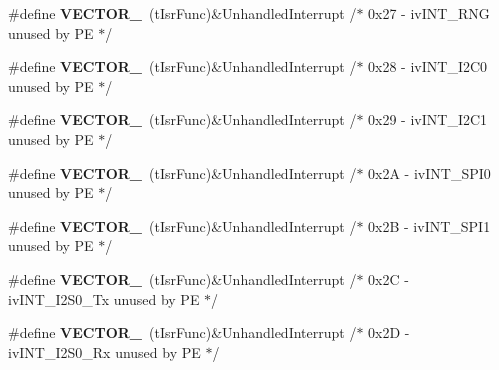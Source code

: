 \begin{DoxyCompactItemize}
\item 
\#define {\bfseries V\+E\+C\+T\+O\+R\+\_}~(t\+Isr\+Func)\&Unhandled\+Interrupt         /$\ast$ 0x27 -\/    iv\+I\+N\+T\+\_\+\+R\+N\+G                      unused by P\+E $\ast$/\hypertarget{group___vectors___config__module_ga8e78b6f08f5736c7d27830555a5fc5af}{}\label{group___vectors___config__module_ga8e78b6f08f5736c7d27830555a5fc5af}

\item 
\#define {\bfseries V\+E\+C\+T\+O\+R\+\_}~(t\+Isr\+Func)\&Unhandled\+Interrupt         /$\ast$ 0x28 -\/    iv\+I\+N\+T\+\_\+\+I2\+C0                     unused by P\+E $\ast$/\hypertarget{group___vectors___config__module_gad5a354561b73a75ae5798b0e790ca397}{}\label{group___vectors___config__module_gad5a354561b73a75ae5798b0e790ca397}

\item 
\#define {\bfseries V\+E\+C\+T\+O\+R\+\_}~(t\+Isr\+Func)\&Unhandled\+Interrupt         /$\ast$ 0x29 -\/    iv\+I\+N\+T\+\_\+\+I2\+C1                     unused by P\+E $\ast$/\hypertarget{group___vectors___config__module_gaac6fd477302bdfa30e4e053c69c0b920}{}\label{group___vectors___config__module_gaac6fd477302bdfa30e4e053c69c0b920}

\item 
\#define {\bfseries V\+E\+C\+T\+O\+R\+\_}~(t\+Isr\+Func)\&Unhandled\+Interrupt         /$\ast$ 0x2\+A -\/    iv\+I\+N\+T\+\_\+\+S\+P\+I0                     unused by P\+E $\ast$/\hypertarget{group___vectors___config__module_ga9363b373824d22c83bd9974ebeca988a}{}\label{group___vectors___config__module_ga9363b373824d22c83bd9974ebeca988a}

\item 
\#define {\bfseries V\+E\+C\+T\+O\+R\+\_}~(t\+Isr\+Func)\&Unhandled\+Interrupt         /$\ast$ 0x2\+B -\/    iv\+I\+N\+T\+\_\+\+S\+P\+I1                     unused by P\+E $\ast$/\hypertarget{group___vectors___config__module_ga1b47c5a4269f149a70a1e8811cef0453}{}\label{group___vectors___config__module_ga1b47c5a4269f149a70a1e8811cef0453}

\item 
\#define {\bfseries V\+E\+C\+T\+O\+R\+\_}~(t\+Isr\+Func)\&Unhandled\+Interrupt         /$\ast$ 0x2\+C -\/    iv\+I\+N\+T\+\_\+\+I2\+S0\+\_\+\+Tx                  unused by P\+E $\ast$/\hypertarget{group___vectors___config__module_gaa8ed1215ef9bb47f5115245fedc392fd}{}\label{group___vectors___config__module_gaa8ed1215ef9bb47f5115245fedc392fd}

\item 
\#define {\bfseries V\+E\+C\+T\+O\+R\+\_}~(t\+Isr\+Func)\&Unhandled\+Interrupt         /$\ast$ 0x2\+D -\/    iv\+I\+N\+T\+\_\+\+I2\+S0\+\_\+\+Rx                  unused by P\+E $\ast$/\hypertarget{group___vectors___config__module_gae9254fee55084aa3875280585ada77ec}{}\label{group___vectors___config__module_gae9254fee55084aa3875280585ada77ec}


\end{DoxyCompactItemize}
